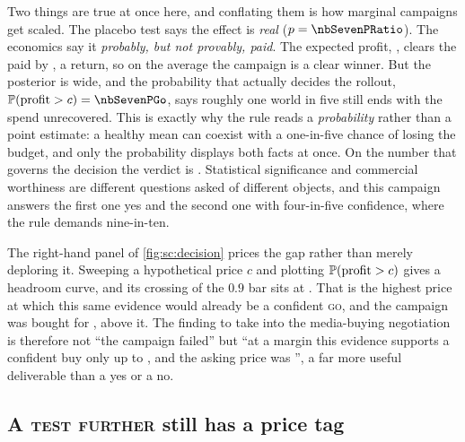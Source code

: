 Two things are true at once here, and conflating them is how marginal campaigns get scaled. The
placebo test says the effect is \emph{real} ($p = \nbSevenPRatio$). The economics say it
\emph{probably, but not provably, paid}. The expected profit, \keur{\nbSevenExpProfit}, clears the
\keur{\nbSevenCost} paid by \keur{\nbSevenExpNet}, a \pc{\nbSevenExpRoi} return, so on the average
the campaign is a clear winner. But the posterior is wide, and the probability that actually decides
the rollout, $\Prob(\text{profit} > c) = \nbSevenPGo$, says roughly one world in five still ends with
the spend unrecovered. This is exactly why the rule reads a \emph{probability} rather than a point
estimate: a healthy mean can coexist with a one-in-five chance of losing the budget, and only the
probability displays both facts at once. On the number that governs the decision the verdict is
\textbf{\nbSevenDecision}. Statistical significance and commercial worthiness are different questions
asked of different objects, and this campaign answers the first one yes and the second one with
four-in-five confidence, where the rule demands nine-in-ten.

The right-hand panel of \cref{fig:sc:decision} prices the gap rather than merely deploring it.
Sweeping a hypothetical price $c$ and plotting $\operatorname{\mathbb{P}}(\text{profit} > c)$ gives a headroom curve, and
its crossing of the $0.9$ bar sits at \keur{\nbSevenHeadroom}. That is the highest price at which this
same evidence would already be a confident \textsc{go}, and the campaign was bought for
\keur{\nbSevenCost}, above it. The finding to take into the media-buying negotiation is therefore not
``the campaign failed'' but ``at a \pc{\nbSevenMargin} margin this evidence supports a confident buy
only up to \keur{\nbSevenHeadroom}, and the asking price was \keur{\nbSevenCost}'', a far more useful
deliverable than a yes or a no.

\subsection*{A \textsc{test further} still has a price tag}

